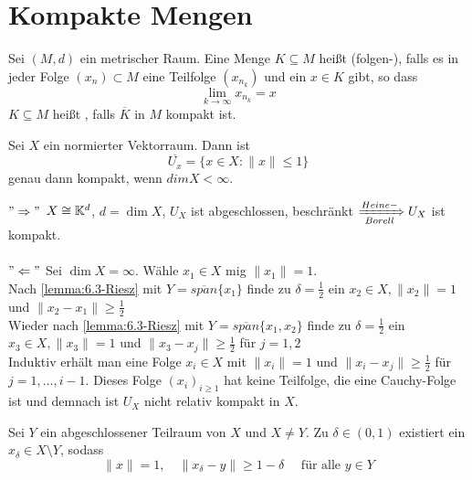 


\section{Kompakte Mengen}



\begin{definition}  
	Sei $(M, d)$ ein metrischer Raum. Eine Menge $K \subseteq M$ hei{\ss}t (folgen-), falls es in jeder Folge $(x_{n}) \subset M$ eine Teilfolge $(x_{n_{k}})$ und ein $x \in K$ gibt, so dass 
		\[ \lim_{k \rightarrow \infty} x_{n_{k}} = x \]
		$K \subseteq M$ hei{\ss}t , falls $\overline{K}$ in $M$ kompakt ist.
\end{definition}


\begin{satz} \label{satz-6.2}
	Sei $X$ ein normierter Vektorraum. Dann ist
	\[ \overline{U_{x}} = \{ x \in X: \| x \| \leq 1 \} \]
	genau dann kompakt, wenn $dim X < \infty$.
\end{satz}
 
\begin{beweis}
	$"\Rightarrow"$ $X \cong \mathbb{K}^{d}$, $d = \dim X$, $U_X$ ist abgeschlossen, beschränkt $\xRightarrow[Borell]{Heine-} U_{X}$ ist kompakt. \\ \\
	$"\Leftarrow"$ Sei $\dim X = \infty$. Wähle $x_1 \in X$ mig $\| x_1 \| = 1$. \\
	Nach \eqref{lemma:6.3-Riesz} mit $ Y = \overline{span}\{ x_{1} \}$ finde zu $\delta = \frac{1}{2}$ ein $x_{2} \in X, \| x_{2} \| = 1$ und $\| x_{2} - x_{1} \| \geq \frac{1}{2}$ \\
	Wieder nach \eqref{lemma:6.3-Riesz} mit $ Y = \overline{span}\{ x_{1}, x_{2} \}$ finde zu $\delta = \frac{1}{2}$ ein $x_{3} \in X, \| x_{3} \| = 1$ und $\| x_{3} - x_{j} \| \geq \frac{1}{2}$ für $j = 1, 2$ \\
	Induktiv erhält man eine Folge $x_{i} \in X$ mit $\| x_{i} \| = 1$ und $\| x_{i} - x_{j} \| \geq \frac{1}{2}$ für $j = 1, \dotsc, i - 1$.
	Dieses Folge $(x_{i})_{i \geq 1}$ hat keine Teilfolge, die eine Cauchy-Folge ist und demnach ist $U_{X}$ nicht relativ kompakt in $X$. 
\end{beweis}


\begin{lemma}[Riesz] \label{lemma:6.3-Riesz} 
	Sei $Y$ ein abgeschlossener Teilraum von $X$ und $X \neq Y$. Zu $\delta \in (0, 1)$ existiert ein $x_{\delta} \in X \setminus Y$, sodass
	\[ \| x \| = 1, \quad \| x_{\delta} - y\| \geq 1 - \delta \quad \text{ für alle } y \in Y \]
\end{lemma}

